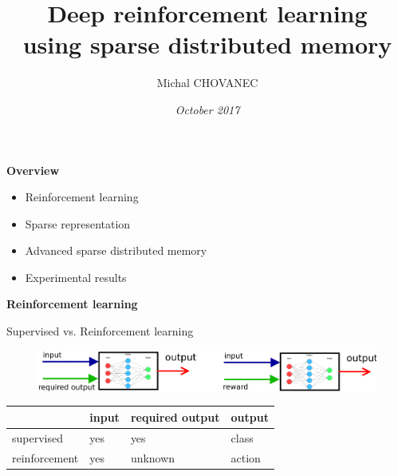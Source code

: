 \documentclass[xcolor=dvipsnames]{beamer}
\title{\bf Deep reinforcement learning \\ using sparse distributed memory}
\author{Michal CHOVANEC}
\date[EURP]{\it October 2017}
\begin{document}
\begin{frame}
\titlepage
\end{frame}



\begin{frame}{\bf Overview}

    \begin{itemize}
      \item Reinforcement learning
      \item Sparse representation
      \item Advanced sparse distributed memory
      \item Experimental results
    \end{itemize}


\end{frame}


\begin{frame}{\bf Reinforcement learning}

\centering
Supervised vs. Reinforcement learning

\begin{figure}[htbp]
  \centering
    \includegraphics[scale=0.27]{../diagrams/supervised_rl.png}
\end{figure}


\begin{table}[]
\centering
\begin{tabular}{|l|l|l|l|}
\hline
              & input & required output & output \\ \hline
supervised    & yes   & yes             & class  \\ \hline
reinforcement & yes   & unknown         & action \\ \hline
\end{tabular}
\end{table}

\end{frame}
\end{document}

